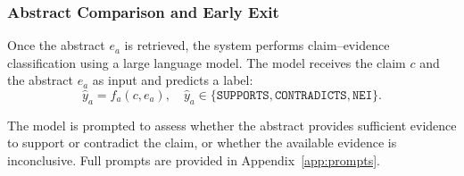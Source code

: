\documentclass{article}
\theoremstyle{plain}
\theoremstyle{definition}
\theoremstyle{remark}
\begin{document}







\subsubsection{Abstract Comparison and Early Exit}
\label{sec:abstract_comparison}

Once the abstract $e_a$ is retrieved, the system performs claim--evidence classification using a large language model. The model receives the claim $c$ and the abstract $e_a$ as input and predicts a label:
\begin{equation}
\hat{y}_a = f_a(c, e_a), \quad \hat{y}_a \in \{\texttt{SUPPORTS}, \texttt{CONTRADICTS}, \texttt{NEI}\}.
\end{equation}

The model is prompted to assess whether the abstract provides sufficient evidence to support or contradict the claim, or whether the available evidence is inconclusive. Full prompts are provided in Appendix~\ref{app:prompts}.
\end{document}
